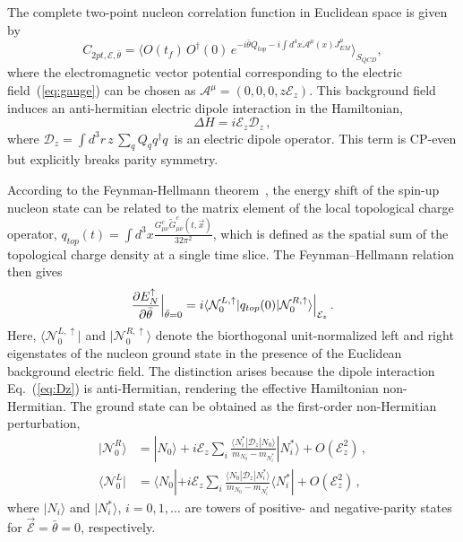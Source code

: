 \documentclass[aps,prl,twocolumn,superscriptaddress,nofootinbib]{revtex4-2}
\newcommand{\mcA}{{\mathcal A}}
\newcommand{\mcD}{{\mathcal D}}
\newcommand{\mcE}{{\mathcal E}}
\newcommand{\mcN}{{\mathcal N}}
\newcommand{\la}{\langle}
\newcommand{\ra}{\rangle}
\begin{document}
The complete two-point nucleon correlation function 
in Euclidean space is given by
\begin{equation}
C_{2pt,\mcE,\bar\theta} =\la O(t_f) \, O^\dag(0) \, e^{ -i\bar{\theta} Q_{top} -i\int d^4x \mcA^\mu(x)J^\mu_{EM} }\ra_{S_{QCD}},
\end{equation}
where the electromagnetic vector potential corresponding to the electric field~(\ref{eq:gauge}) can be chosen as $\mcA^\mu=(0,0,0,z\mcE_z)$. This background field induces an anti-hermitian electric dipole interaction in the Hamiltonian,
\begin{equation}\label{eq:Dz}
\Delta H = i\mcE_z \mcD_z\,, 
\end{equation}
where $\mcD_z = \int d^3r \, z \,\sum_q Q_q q^\dag q\,$ is an electric dipole operator. This term is CP-even but explicitly
breaks parity symmetry.

According to the Feynman-Hellmann theorem~\cite{Feynman:1939zza}, the energy shift of the spin-up nucleon state can be related to
the matrix element of the local topological charge operator, $q_{top}(t)= \int d^3x \frac{G^c_{\mu\nu}  {\widetilde G^c_{\mu\nu}}(t,\vec x) }{32\pi^2}$, 
which is defined as the spatial sum of the topological charge density at a single time slice. The Feynman–Hellmann relation then gives
\begin{equation}
\label{eq:localq}
\frac{\partial E^\uparrow_N}{\partial \bar{\theta}}\Big{|}_{\bar{\theta}=0} 
= i \la \mathcal{N}^{L,\uparrow}_0|q_{top}(0)|\mathcal{N}^{R,\uparrow}_0\ra\Big|_{\mcE_z}\,. 
\end{equation}
Here, $\la \mathcal{N}^{L,\uparrow}_0|$ and $|\mathcal{N}^{R,\uparrow}_0\ra$  denote the biorthogonal unit-normalized left
and right eigenstates of  the nucleon ground state in the presence of the Euclidean background electric
field. The distinction arises because the  dipole interaction Eq.~(\ref{eq:Dz}) is anti-Hermitian, rendering
the effective Hamiltonian non-Hermitian. 
The ground state can be obtained as the first-order non-Hermitian perturbation,
\begin{equation}
\label{eq:Npm}
\begin{aligned}
|\mcN^R_0\ra &= |N_0\ra
+ i\mcE_z \sum_{i} \frac{\la N^*_i|\mcD_z|N_0\ra}{m_{N_0} - m_{N^*_i}} |N^*_i\ra + O(\mcE_z^2) \,,\\
\la\mcN^L_0| &= \la N_0| 
+ i\mcE_z \sum_{i} \frac{\la N_0|\mcD_z|N^*_i\ra}{m_{N_0} - m_{N^*_i}} \la N^*_i| + O(\mcE_z^2)\,, 
\end{aligned}
\end{equation}
where $|N_i\ra$ and $|N^*_i\ra$, $i=0,1,\ldots$ are towers of positive- and negative-parity
states for $\vec\mcE=\bar\theta=0$, respectively.
\end{document}
